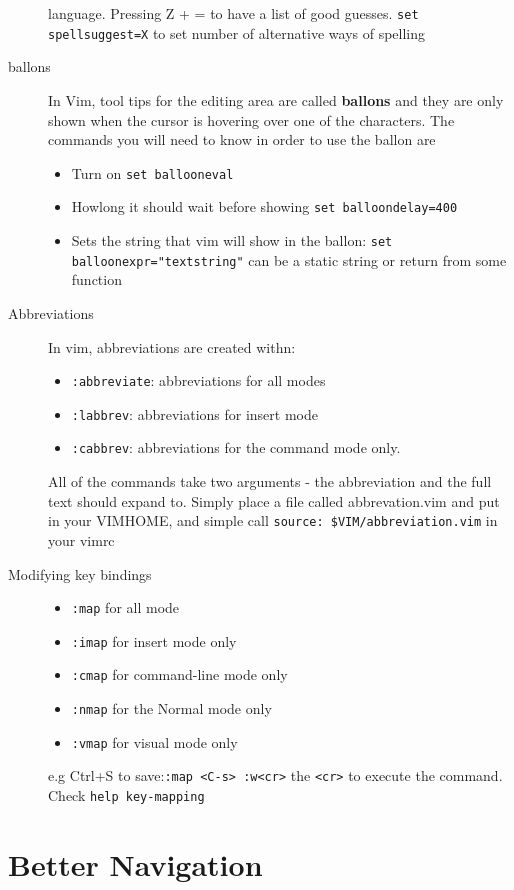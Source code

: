 \documentclass[11pt]{book}
\begin{document}
\begin{description}
language. Pressing Z + = to have a list of good guesses.
 \verb|set spellsuggest=X| to set number of alternative ways of spelling
\item[ballons] In Vim, tool tips for the editing area are called
\textbf{ballons} and they are only shown when the cursor is hovering over one of
the characters. The commands you will need to know in order to use the ballon
are
    \begin{itemize}
        \item Turn on \verb|set ballooneval|
        \item Howlong it should wait before showing \verb|set balloondelay=400|
        \item Sets the string that vim will show in the ballon:
            \verb|set balloonexpr="textstring"| can be a static string or return
            from some function
    \end{itemize}
\item[Abbreviations] In vim, abbreviations are created withn:
    \begin{itemize}
        \item \verb|:abbreviate|: abbreviations for all modes
        \item \verb|:labbrev|: abbreviations for insert mode
        \item \verb|:cabbrev|: abbreviations for the command mode only.
    \end{itemize}
    All of the commands take two arguments - the abbreviation and the full text
    should expand to.
    Simply place a file called abbrevation.vim and put in your VIMHOME, and
    simple call \verb|source: $VIM/abbreviation.vim| in your vimrc
\item[Modifying key bindings]
    \begin{itemize}
    \item \verb|:map| for all mode
    \item \verb|:imap| for insert mode only
    \item \verb|:cmap| for command-line mode only
    \item \verb|:nmap| for the Normal mode only
    \item \verb|:vmap| for visual mode only
    \end{itemize}
    e.g Ctrl+S to save:\verb|:map <C-s> :w<cr>| the \verb|<cr>| to execute the
    command. Check \verb|help key-mapping|
\end{description}

 \chapter{Better Navigation}
\end{document}
